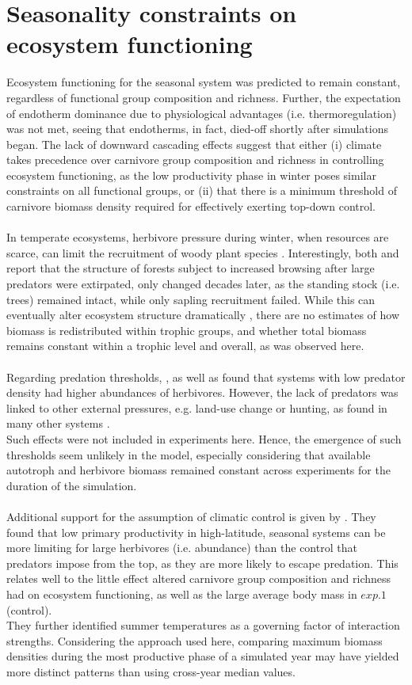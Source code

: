 \section{Seasonality constraints on ecosystem functioning}
Ecosystem functioning for the seasonal system was predicted to remain constant, regardless of functional group composition and richness. Further, the expectation of endotherm dominance due to physiological advantages (i.e. thermoregulation) was not met, seeing that endotherms, in fact, died-off shortly after simulations began. The lack of downward cascading effects suggest that either (i) climate takes precedence over carnivore group composition and richness in controlling ecosystem functioning, as the low productivity phase in winter poses similar constraints on all functional groups, or (ii) that there is a minimum threshold of carnivore biomass density required for effectively exerting top-down control.\\\\
In temperate ecosystems, herbivore pressure during winter, when resources are scarce, can limit the recruitment of woody plant species \citep{Ripple2014}.
Interestingly, both \cite{Casabon2007} and \citep{Beschta2009} report that the structure of forests subject to increased browsing after large predators were extirpated, only changed decades later, as the standing stock (i.e. trees) remained intact, while only sapling recruitment failed.
While this can eventually alter ecosystem structure dramatically \citep{Terborgh2001, Estes2011}, there are no estimates of how biomass is redistributed within trophic groups, and whether total biomass remains constant within a trophic level and overall, as was observed here. \\\\
Regarding predation thresholds, \cite{Ripple2012}, as well as \cite{Johnson2009} found that systems with low predator density had higher abundances of herbivores. However, the lack of predators was linked to other external pressures, e.g. land-use change or hunting, as found in many other systems \citep{Estes2011,Ripple2014}. \\
Such effects were not included in experiments here. Hence, the emergence of such thresholds seem unlikely in the model, especially considering that available autotroph and herbivore biomass remained constant across experiments for the duration of the simulation. \\\\
Additional support for the assumption of climatic control is given by  \cite{Legagneux2014}. They found that low primary productivity in high-latitude, seasonal systems can be more limiting for large herbivores (i.e. abundance) than the control that predators impose from the top, as they are more likely to escape predation. 
This relates well to the little effect altered carnivore group composition and richness had on ecosystem functioning, as well as the large average body mass in $exp. 1$ (control). \\
They further identified summer temperatures as a governing factor of interaction strengths. Considering the approach used here, comparing maximum biomass densities during the most productive phase of a simulated year may have yielded more distinct patterns than using cross-year median values.
